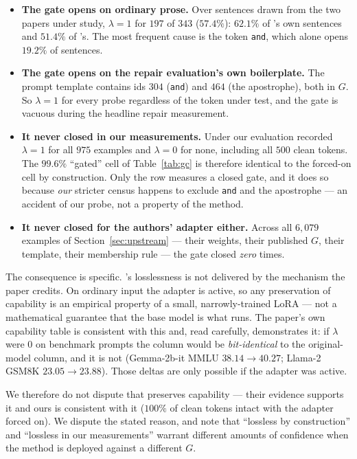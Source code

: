 \begin{itemize}[leftmargin=*]
\item \textbf{The gate opens on ordinary prose.} Over sentences drawn from the two
papers under study, $\lambda = 1$ for $197$ of $343$ ($57.4\%$): $62.1\%$ of
\gc{}'s own sentences and $51.4\%$ of \gp{}'s. The most frequent cause is the
token \texttt{and}, which alone opens $19.2\%$ of sentences.
\item \textbf{The gate opens on the repair evaluation's own boilerplate.} The
prompt template contains ids $304$ (\texttt{and}) and $464$ (the apostrophe),
both in $G$. So $\lambda = 1$ for every probe regardless of the token under test,
and the gate is vacuous during the headline repair measurement.
\item \textbf{It never closed in our measurements.} Under \Pcode{} our evaluation
recorded $\lambda = 1$ for all $975$ examples and $\lambda = 0$ for none,
including all $500$ clean tokens. The $99.6\%$ ``gated'' cell of
Table~\ref{tab:gc} is therefore identical to the forced-on cell by construction.
Only the \Ppaper{} row measures a closed gate, and it does so because \emph{our}
stricter census happens to exclude \texttt{and} and the apostrophe --- an accident
of our probe, not a property of the method.
\item \textbf{It never closed for the authors' adapter either.} Across all
$6{,}079$ examples of Section~\ref{sec:upstream} --- their weights, their
published $G$, their template, their membership rule --- the gate closed
\emph{zero} times.
\end{itemize}

The consequence is specific. \gc{}'s losslessness is not delivered by the
mechanism the paper credits. On ordinary input the adapter is active, so any
preservation of capability is an empirical property of a small,
narrowly-trained LoRA --- not a mathematical guarantee that the base model is what
runs. The paper's own capability table is consistent with this and, read
carefully, demonstrates it: if $\lambda$ were $0$ on benchmark prompts the \gc{}
column would be \emph{bit-identical} to the original-model column, and it is not
(Gemma-2b-it MMLU $38.14 \rightarrow 40.27$; Llama-2 GSM8K
$23.05 \rightarrow 23.88$). Those deltas are only possible if the adapter was
active.

We therefore do not dispute that \gc{} preserves capability --- their evidence
supports it and ours is consistent with it ($100\%$ of clean tokens intact with
the adapter forced on). We dispute the stated reason, and note that ``lossless by
construction'' and ``lossless in our measurements'' warrant different amounts of
confidence when the method is deployed against a different $G$.

